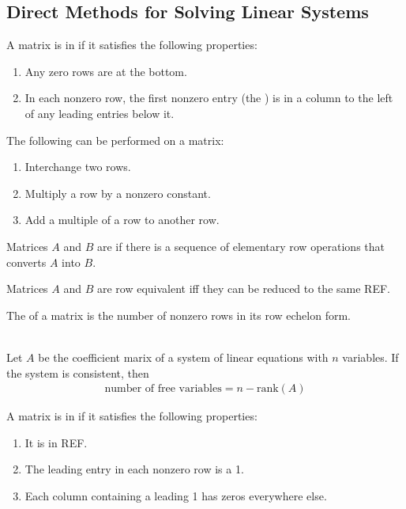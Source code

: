 \documentclass{article}
\begin{document}
\subsection{Direct Methods for Solving Linear Systems}
\begin{definition}
    A matrix is in  if it satisfies the following properties:
    \begin{enumerate}
        \item Any zero rows are at the bottom.
        \item In each nonzero row, the first nonzero entry (the ) is in a column to the left of any leading entries below it.
    \end{enumerate}
\end{definition}
\begin{definition}
    The following  can be performed on a matrix:
    \begin{enumerate}
        \item Interchange two rows.
        \item Multiply a row by a nonzero constant.
        \item Add a multiple of a row to another row.
    \end{enumerate}
\end{definition}
\begin{definition}
    Matrices $A$ and $B$ are  if there is a sequence of elementary row operations that converts $A$ into $B$.
\end{definition}
\begin{theorem}
    Matrices $A$ and $B$ are row equivalent iff they can be reduced to the same REF.
\end{theorem}
\begin{definition}
    The  of a matrix is the number of nonzero rows in its row echelon form.
\end{definition}
\begin{theorem}
    \\
    Let $A$ be the coefficient marix of a system of linear equations with $n$ variables. If the system is consistent, then
    \begin{gather*}
        \text{number of free variables}=n-\text{rank}(A)
    \end{gather*}
\end{theorem}
\begin{definition}
    A matrix is in  if it satisfies the following properties:
    \begin{enumerate}
        \item It is in REF. 
        \item The leading entry in each nonzero row is a 1.
        \item Each column containing a leading 1 has zeros everywhere else.
    \end{enumerate}
\end{definition}
\end{document}
